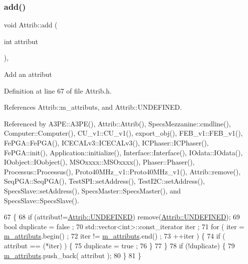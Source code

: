 \subsubsection{\texorpdfstring{add()}{add()}}
{\footnotesize\ttfamily void Attrib\+::add (\begin{DoxyParamCaption}\item[{int}]{attribut }\end{DoxyParamCaption})\hspace{0.3cm}{\ttfamily [inline]}, {\ttfamily [inherited]}}

Add an attribut 

Definition at line 67 of file Attrib.\+h.



References Attrib\+::m\+\_\+attributs, and Attrib\+::\+U\+N\+D\+E\+F\+I\+N\+ED.



Referenced by A3\+P\+E\+::\+A3\+P\+E(), Attrib\+::\+Attrib(), Specs\+Mezzanine\+::cmdline(), Computer\+::\+Computer(), C\+U\+\_\+v1\+::\+C\+U\+\_\+v1(), export\+\_\+obj(), F\+E\+B\+\_\+v1\+::\+F\+E\+B\+\_\+v1(), Fe\+P\+G\+A\+::\+Fe\+P\+G\+A(), I\+C\+E\+C\+A\+Lv3\+::\+I\+C\+E\+C\+A\+Lv3(), I\+C\+Phaser\+::\+I\+C\+Phaser(), Fe\+P\+G\+A\+::init(), Application\+::initialize(), Interface\+::\+Interface(), I\+Odata\+::\+I\+Odata(), I\+Oobject\+::\+I\+Oobject(), M\+S\+Oxxxx\+::\+M\+S\+Oxxxx(), Phaser\+::\+Phaser(), Processus\+::\+Processus(), Proto40\+M\+Hz\+\_\+v1\+::\+Proto40\+M\+Hz\+\_\+v1(), Attrib\+::remove(), Seq\+P\+G\+A\+::\+Seq\+P\+G\+A(), Test\+S\+P\+I\+::set\+Address(), Test\+I2\+C\+::set\+Address(), Specs\+Slave\+::set\+Address(), Specs\+Master\+::\+Specs\+Master(), and Specs\+Slave\+::\+Specs\+Slave().


\begin{DoxyCode}
67                             \{
68     \textcolor{keywordflow}{if} (attribut!=\hyperlink{classAttrib_a69e171d7cc6417835a5a306d3c764235a3a8da2ab97dda18aebab196fe4100531}{Attrib::UNDEFINED}) \textcolor{keyword}{remove}(\hyperlink{classAttrib_a69e171d7cc6417835a5a306d3c764235a3a8da2ab97dda18aebab196fe4100531}{Attrib::UNDEFINED});
69     \textcolor{keywordtype}{bool} duplicate = false ;
70     std::vector<int>::const\_iterator iter ;
71     \textcolor{keywordflow}{for} ( iter  = \hyperlink{classAttrib_ac4bd58a0cc6b38a3b711d609a3d3aacc}{m\_attributs}.begin() ;
72           iter != \hyperlink{classAttrib_ac4bd58a0cc6b38a3b711d609a3d3aacc}{m\_attributs}.end()   ;
73           ++iter ) \{
74       \textcolor{keywordflow}{if} ( attribut == (*iter) ) \{
75         duplicate = true ;
76       \}
77     \}
78     \textcolor{keywordflow}{if} (!duplicate) \{
79       \hyperlink{classAttrib_ac4bd58a0cc6b38a3b711d609a3d3aacc}{m\_attributs}.push\_back( attribut );
80     \}
81   \}
\end{DoxyCode}
\mbox{\label{classHierarchy_ad677774ff38fcb257c04a3a10d471fac}} 

